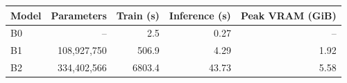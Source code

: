 \begin{tabular}{lrrrr}
\toprule
Model & Parameters & Train (s) & Inference (s) & Peak VRAM (GiB) \\
\midrule
B0 & -- & 2.5 & 0.27 & -- \\
B1 & 108,927,750 & 506.9 & 4.29 & 1.92 \\
B2 & 334,402,566 & 6803.4 & 43.73 & 5.58 \\
\bottomrule
\end{tabular}

